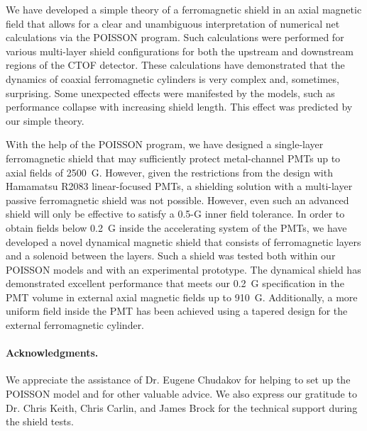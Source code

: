 \documentclass[12pt]{article}
\begin{document}
We have developed a simple theory of a ferromagnetic shield in an axial magnetic 
field  that   allows for a clear and unambiguous interpretation of numerical net 
calculations via the POISSON program. Such calculations were performed for various 
multi-layer shield configurations for both the upstream and downstream regions of 
the CTOF detector. These calculations have demonstrated that the dynamics of coaxial 
ferromagnetic cylinders is very complex and, sometimes, surprising. Some unexpected 
effects were manifested by the models, such as performance collapse with increasing 
shield length. This effect was predicted by our simple theory.

With the help of the POISSON program, we have designed a single-layer ferromagnetic 
shield that may sufficiently protect metal-channel PMTs up to axial fields of 
2500~G. However, given the restrictions from the design with Hamamatsu R2083 
linear-focused PMTs, a shielding solution with a multi-layer passive ferromagnetic 
shield was not possible. However, even such an advanced shield will only be effective 
to satisfy a 0.5-G inner field tolerance. In order to obtain fields below 0.2~G 
inside the accelerating system of the PMTs, we have developed a novel dynamical 
magnetic shield that consists of ferromagnetic layers and a solenoid between the 
layers. Such a shield was tested both within our POISSON models and with an 
experimental prototype. The dynamical shield has demonstrated excellent performance 
that meets our 0.2~G specification in the PMT volume in external axial magnetic 
fields up to 910~G. Additionally, a more uniform field inside the PMT has been 
achieved using a tapered design for the external ferromagnetic cylinder. 

\paragraph{Acknowledgments.}
We appreciate the assistance of Dr. Eugene Chudakov for helping to set up
the POISSON model and for other valuable advice. We also express our gratitude 
to Dr. Chris Keith, Chris Carlin, and James Brock for the technical 
support during the shield tests.
\end{document}
